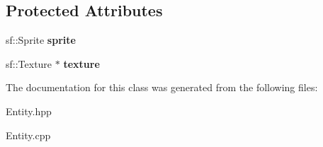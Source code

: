 \subsection*{Protected Attributes}
\begin{DoxyCompactItemize}
\item 
\hypertarget{class_entity_a48ef4ab143b8d0211877c9f6be42e824}{sf\-::\-Sprite {\bfseries sprite}}\label{class_entity_a48ef4ab143b8d0211877c9f6be42e824}

\item 
\hypertarget{class_entity_a1eb77bbf42f194fe03ecdeec3cbe8ad0}{sf\-::\-Texture $\ast$ {\bfseries texture}}\label{class_entity_a1eb77bbf42f194fe03ecdeec3cbe8ad0}

\end{DoxyCompactItemize}


The documentation for this class was generated from the following files\-:\begin{DoxyCompactItemize}
\item 
Entity.\-hpp\item 
Entity.\-cpp\end{DoxyCompactItemize}
